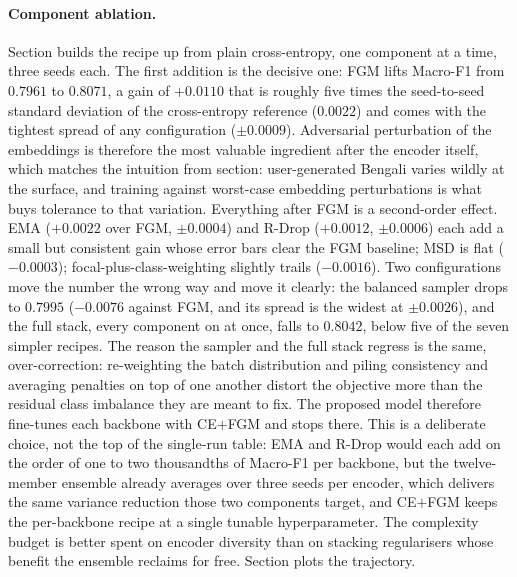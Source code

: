 \documentclass[11pt,a4paper]{article}
\def\Cref#1{Section}%
\def\cref#1{section}%
\begin{document}
\paragraph{Component ablation.} \Cref{tab:component} builds the recipe up from plain cross-entropy, one component at a time, three seeds each. The first addition is the decisive one: FGM lifts Macro-F1 from $0.7961$ to $0.8071$, a gain of $+0.0110$ that is roughly five times the seed-to-seed standard deviation of the cross-entropy reference ($0.0022$) and comes with the tightest spread of any configuration ($\pm0.0009$). Adversarial perturbation of the embeddings is therefore the most valuable ingredient after the encoder itself, which matches the intuition from \cref{sec:objective}: user-generated Bengali varies wildly at the surface, and training against worst-case embedding perturbations is what buys tolerance to that variation. Everything after FGM is a second-order effect. EMA ($+0.0022$ over FGM, $\pm0.0004$) and R-Drop ($+0.0012$, $\pm0.0006$) each add a small but consistent gain whose error bars clear the FGM baseline; MSD is flat ($-0.0003$); focal-plus-class-weighting slightly trails ($-0.0016$). Two configurations move the number the wrong way and move it clearly: the balanced sampler drops to $0.7995$ ($-0.0076$ against FGM, and its spread is the widest at $\pm0.0026$), and the full stack, every component on at once, falls to $0.8042$, below five of the seven simpler recipes. The reason the sampler and the full stack regress is the same, over-correction: re-weighting the batch distribution and piling consistency and averaging penalties on top of one another distort the objective more than the residual class imbalance they are meant to fix. The proposed model therefore fine-tunes each backbone with CE$+$FGM and stops there. This is a deliberate choice, not the top of the single-run table: EMA and R-Drop would each add on the order of one to two thousandths of Macro-F1 per backbone, but the twelve-member ensemble already averages over three seeds per encoder, which delivers the same variance reduction those two components target, and CE$+$FGM keeps the per-backbone recipe at a single tunable hyperparameter. The complexity budget is better spent on encoder diversity than on stacking regularisers whose benefit the ensemble reclaims for free. \Cref{fig:ablation} plots the trajectory.
\end{document}
